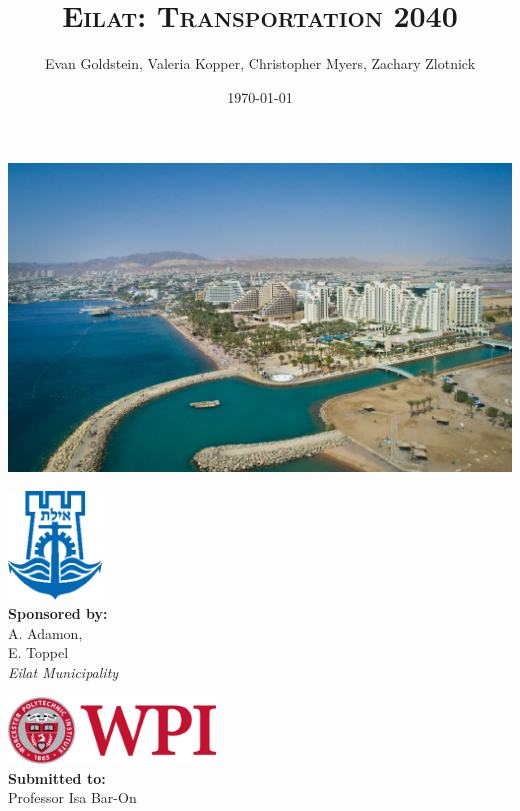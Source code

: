 \documentclass[12pt]{article}                               %
\title{\scshape Eilat: Transportation 2040}
\author{Evan Goldstein, Valeria Kopper, Christopher Myers, Zachary Zlotnick}
\date{\today}
\begin{document}
\maketitle

\begin{center}
    \includegraphics[width=1\textwidth]{images/eilat.jpg}
\end{center}
\vspace{1cm}

\begin{minipage}{0.45\textwidth}
    \begin{flushleft} \large
        \includegraphics[width=2.5cm]{images/eilat_logo.png} \\
        \textbf{Sponsored by:} \\
        A. Adamon, \\
        E. Toppel \\
        \textit{Eilat Municipality}
    \end{flushleft}
\end{minipage}
\begin{minipage}{0.45\textwidth}
    \begin{flushright} \large
        \includegraphics[width=5.5cm]{images/WPI_logo.png} \\
        \vspace{1.0cm}
        \textbf{Submitted to:}\\
        Professor Isa Bar-On
        \vspace{1.5cm}
    \end{flushright}
\end{minipage}
\newpage
\end{document}
